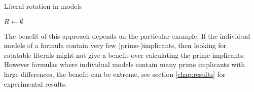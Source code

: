 

\begin{algorithm}
\caption{{\sc Literal rotation in models }}
\DontPrintSemicolon
{}
$R \gets \emptyset$\;
\;

\end{algorithm}

The benefit of this approach depends on the particular example. If the individual models of a formula contain very few (prime-)implicants, then looking for rotatable literals might not give a benefit over calculating the prime implicants. However formulas where individual models contain many prime implicants with large differences, the benefit can be extreme, see section \ref{chap:results} for experimental results.




